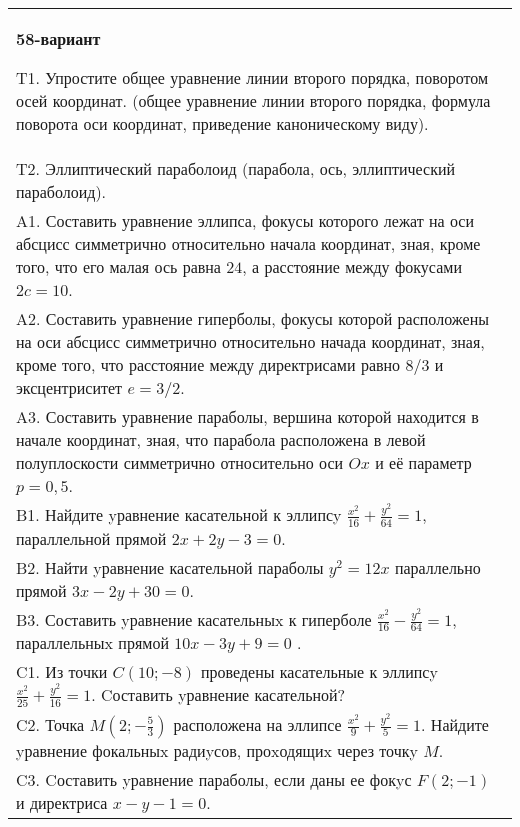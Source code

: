 \documentclass{article}
\begin{document}
\begin{tabular}{m{17cm}}
\textbf{58-вариант}
\newline

T1. Упростите общее уравнение линии второго порядка, поворотом осей координат. (общее уравнение линии второго порядка, формула поворота оси координат, приведение каноническому виду).\\

T2. Эллиптический параболоид (парабола, ось, эллиптический параболоид).\\

A1. Составить уравнение эллипса, фокусы которого лежат на оси абсцисс симметрично относительно начала координат, зная, кроме того, что его малая ось равна $24$, а расстояние между фокусами $2c=10$.\\

A2. Составить уравнение гиперболы, фокусы которой расположены на оси абсцисс симметрично относительно начада координат, зная, кроме того, что расстояние между директрисами равно $8/3$ и эксцентриситет $e=3/2$.\\

A3. Составить уравнение параболы, вершина которой находится в начале координат, зная, что парабола расположена в левой полуплоскости симметрично относительно оси $Ox$ и её параметр $p=0,5$.\\

B1. Найдите yравнение касательной к эллипсy $\frac{x^{2}}{16} + \frac{y^{2}}{64} = 1$, параллельной прямой $2x + 2y - 3 = 0$.  \\

B2. Найти yравнение касательной параболы $y^{2} = 12x$ параллельно прямой $3x - 2y + 30 = 0$.  \\

B3. Составить yравнение касательныx к гиперболе $\frac{x^{2}}{16} - \frac{y^{2}}{64} = 1$, параллельныx прямой $10x - 3y + 9 = 0$ .  \\

C1. Из точки $C(10;-8)$ проведены касательные к эллипсy $\frac{x^{2}}{25}+\frac{y^{2}}{16}=1$. Cоставить yравнение касательной?  \\

C2. Точка $M(2;-\frac{5}{3})$ расположена на эллипсе $\frac{x^{2}}{9}+\frac{y^{2}}{5}=1$. Найдите yравнение фокальныx радиyсов, проxодящиx через точкy $M$.  \\

C3. Cоставить yравнение параболы, если даны ее фокyс $F(2;-1)$ и директриса $x-y-1=0$.  \\

\end{tabular}
\vspace{1cm}
\end{document}
